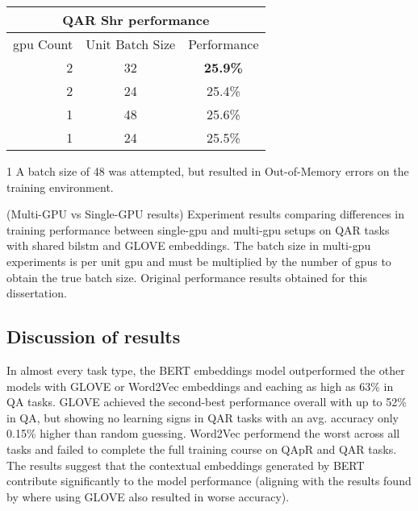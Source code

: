 \begin{table}[]
    \begin{threeparttable}
        \begin{tabular}{rc|c}
            \toprule
            \multicolumn{3}{c}{QA\rightarrow{}R Shr performance} \\
            \midrule
            \gls{gpu} Count & Unit Batch Size & Performance      \\
            2               & 32              & \textbf{25.9\%}\tnote{1}  \\
            2               & 24              & 25.4\%           \\
            1               & 48              & 25.6\%           \\
            1               & 24              & 25.5\%           \\
            \bottomrule
        \end{tabular}
        \begin{tablenotes}
            \item[1] A batch size of 48 was attempted, but resulted in Out-of-Memory errors on the training environment.
        \end{tablenotes}
    \end{threeparttable}
    \captionsource(Multi-GPU vs Single-GPU results)
    {Experiment results comparing differences in training performance between single-\gls{gpu} and multi-\gls{gpu} setups on QA\rightarrow{}R tasks with shared \gls{bilstm} and GLOVE embeddings. The batch size in multi-\gls{gpu} experiments is per unit \gls{gpu} and must be multiplied by the number of \glspl{gpu} to obtain the true batch size. \label{tab:single-vs-multi-gpu-experiment-results}}
    {Original performance results obtained for this dissertation.}
\end{table}

\subsection{Discussion of results}
\label{subsec:discussion_of_results}

In almost every task type, the BERT embeddings model outperformed the other models with GLOVE or Word2Vec embeddings and eaching as high as 63\% in Q\rightarrow{}A tasks.
GLOVE achieved the second-best performance overall with up to 52\% in Q\rightarrow{}A, but showing no learning signs in Q\rightarrow{}AR tasks with an avg. accuracy only 0.15\% higher than random guessing.
Word2Vec performend the worst across all tasks and failed to complete the full training course on QAp\rightarrow{}R and Q\rightarrow{}AR tasks.
The results suggest that the contextual embeddings generated by BERT contribute significantly to the model performance (aligning with the results found by \citeauthor{zellers_recognition_2019} where using GLOVE also resulted in worse accuracy\cite{zellers_recognition_2019}).


